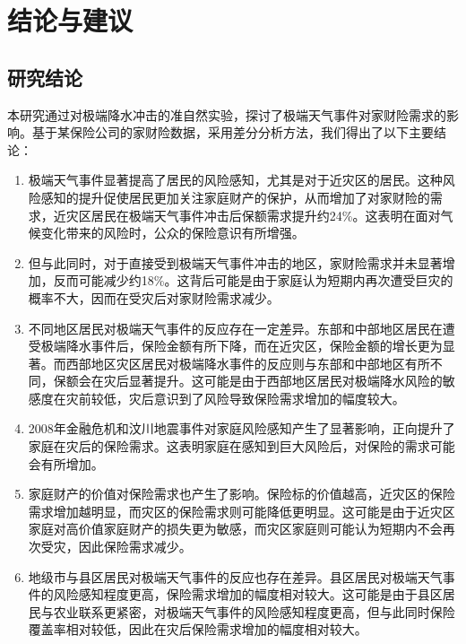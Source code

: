 \chapter{结论与建议}\label{chap:5}

\section{研究结论}

本研究通过对极端降水冲击的准自然实验，探讨了极端天气事件对家财险需求的影响。基于某保险公司的家财险数据，采用差分分析方法，我们得出了以下主要结论：
\begin{enumerate}
    \item 极端天气事件显著提高了居民的风险感知，尤其是对于近灾区的居民。这种风险感知的提升促使居民更加关注家庭财产的保护，从而增加了对家财险的需求，近灾区居民在极端天气事件冲击后保额需求提升约24\%。这表明在面对气候变化带来的风险时，公众的保险意识有所增强。

    \item 但与此同时，对于直接受到极端天气事件冲击的地区，家财险需求并未显著增加，反而可能减少约18\%。这背后可能是由于家庭认为短期内再次遭受巨灾的概率不大，因而在受灾后对家财险需求减少。

    \item 不同地区居民对极端天气事件的反应存在一定差异。东部和中部地区居民在遭受极端降水事件后，保险金额有所下降，而在近灾区，保险金额的增长更为显著。而西部地区灾区居民对极端降水事件的反应则与东部和中部地区有所不同，保额会在灾后显著提升。这可能是由于西部地区居民对极端降水风险的敏感度在灾前较低，灾后意识到了风险导致保险需求增加的幅度较大。

    \item 2008年金融危机和汶川地震事件对家庭风险感知产生了显著影响，正向提升了家庭在灾后的保险需求。这表明家庭在感知到巨大风险后，对保险的需求可能会有所增加。

    \item 家庭财产的价值对保险需求也产生了影响。保险标的价值越高，近灾区的保险需求增加越明显，而灾区的保险需求则可能降低更明显。这可能是由于近灾区家庭对高价值家庭财产的损失更为敏感，而灾区家庭则可能认为短期内不会再次受灾，因此保险需求减少。

    \item 地级市与县区居民对极端天气事件的反应也存在差异。县区居民对极端天气事件的风险感知程度更高，保险需求增加的幅度相对较大。这可能是由于县区居民与农业联系更紧密，对极端天气事件的风险感知程度更高，但与此同时保险覆盖率相对较低，因此在灾后保险需求增加的幅度相对较大。
\end{enumerate}

